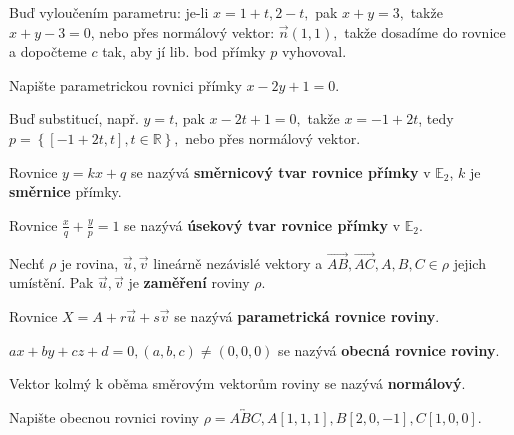 \begin{reseni}
Buď vyloučením parametru: je-li $x=1+t, 2-t,$ pak $x+y=3,$ takže $x+y-3=0$, nebo
přes normálový vektor: $\vec n(1,1),$ takže dosadíme do rovnice a dopočteme $c$ tak,
aby jí lib. bod přímky $p$ vyhovoval.
\end{reseni}

\begin{priklad}
Napište parametrickou rovnici přímky $x-2y+1=0.$
\end{priklad}

\begin{reseni}
Buď substitucí, např. $y=t$, pak $x-2t+1=0,$ takže $x=-1+2t$, tedy $p=\left \{ [-1+2t,t], t \in \mathbb R \right \}, $
nebo přes normálový vektor.
\end{reseni}

\begin{definition}
    Rovnice $y=kx+q$ se nazývá \textbf{směrnicový tvar rovnice přímky} v $\mathbb E_2$,
    $k$ je \textbf{směrnice} přímky.
\end{definition}

\begin{definition}
Rovnice $\frac{x}{q}+\frac{y}{p}=1$ se nazývá \textbf{úsekový tvar rovnice přímky} v $\mathbb E_2$.
\end{definition}

\begin{definition}
Nechť $\rho$ je rovina, $\vec u, \vec v$ lineárně nezávislé vektory a $\overrightarrow{AB},
\overrightarrow{AC}, A,B,C\in \rho$ jejich umístění. Pak $\vec u, \vec v$ je
\textbf{zaměření} roviny $\rho.$
\end{definition}

\begin{definition}
    Rovnice $X=A+r\vec u+s\vec v$ se nazývá \textbf{parametrická rovnice roviny}.
\end{definition}

\begin{definition}
    $ax+by+cz+d=0, (a,b,c)\ne(0,0,0)$ se nazývá \textbf{obecná rovnice roviny}.
\end{definition}

\begin{definition}
    Vektor kolmý k oběma směrovým vektorům roviny se nazývá \textbf{normálový}.
\end{definition}

\begin{priklad}
Napište obecnou rovnici roviny $\rho = \overleftrightarrow{ABC}, A[1,1,1], B[2,0,-1], C[1,0,0].$
\end{priklad}

